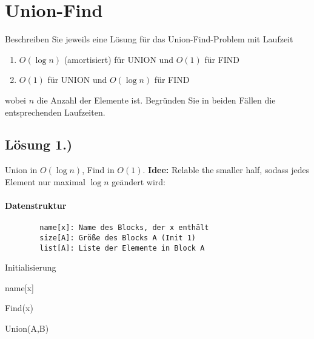 \section{Union-Find}
	Beschreiben Sie jeweils eine Lösung für das Union-Find-Problem mit Laufzeit
	\begin{enumerate}
		\item $O(\log n)$ (amortisiert) für UNION und $O(1)$ für FIND
		\item $O(1)$ für UNION und $O(\log n)$ für FIND
	\end{enumerate}	
	wobei $n$ die Anzahl der Elemente ist. Begründen Sie in beiden Fällen die entsprechenden Laufzeiten.

	\subsection*{Lösung 1.)} Union in $ O(\log n) $, Find in $ O(1) $. \textbf{Idee:} Relable the smaller half, sodass jedes Element nur maximal $ \log n $ geändert wird:
	\paragraph{Datenstruktur}
	\begin{verbatim}
	    name[x]: Name des Blocks, der x enthält
	    size[A]: Größe des Blocks A (Init 1)
	    list[A]: Liste der Elemente in Block A
	\end{verbatim}
	    \vspace{5mm}
    \begin{algorithm}[H]
    \SetAlgoLined
    \caption{Initialisierung}
    \end{algorithm}
        \vspace{5mm}
    \begin{algorithm}[H]
    \SetAlgoLined
    \Return name[x]\;
    \caption{Find(x)}
    \end{algorithm}
        \vspace{5mm}
    \begin{algorithm}[H]

    \caption{Union(A,B)}
    \end{algorithm}
    
